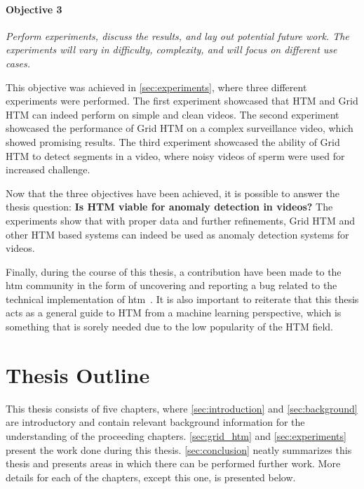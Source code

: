 \paragraph*{Objective 3} \emph{Perform experiments, discuss the results, and lay out potential future work. The experiments will vary in difficulty, complexity, and will focus on different use cases.}
\par
This objective was achieved in \autoref{sec:experiments}, where three different experiments were performed. The first experiment showcased that HTM and Grid HTM can indeed perform on simple and clean videos. The second experiment showcased the performance of Grid HTM on a complex surveillance video, which showed promising results. The third experiment showcased the ability of Grid HTM to detect segments in a video, where noisy videos of sperm were used for increased challenge.
\par
Now that the three objectives have been achieved, it is possible to answer the thesis question: \textbf{Is HTM viable for anomaly detection in videos?} The experiments show that with proper data and further refinements, Grid HTM and other HTM based systems can indeed be used as anomaly detection systems for videos.
\par
Finally, during the course of this thesis, a contribution have been made to the  \gls*{htm} community in the form of uncovering and reporting a bug related to the technical implementation of  \gls*{htm}~\cite{github_contrib}. It is also important to reiterate that this thesis acts as a general guide to HTM from a machine learning perspective, which is something that is sorely needed due to the low popularity of the HTM field.

\section{Thesis Outline}
This thesis consists of five chapters, where \autoref{sec:introduction} and \autoref{sec:background} are introductory and contain relevant background information for the understanding of the proceeding chapters. \autoref{sec:grid_htm} and \autoref{sec:experiments} present the work done during this thesis. \autoref{sec:conclusion} neatly summarizes this thesis and presents areas in which there can be performed further work. More details for each of the chapters, except this one, is presented below.
\par
